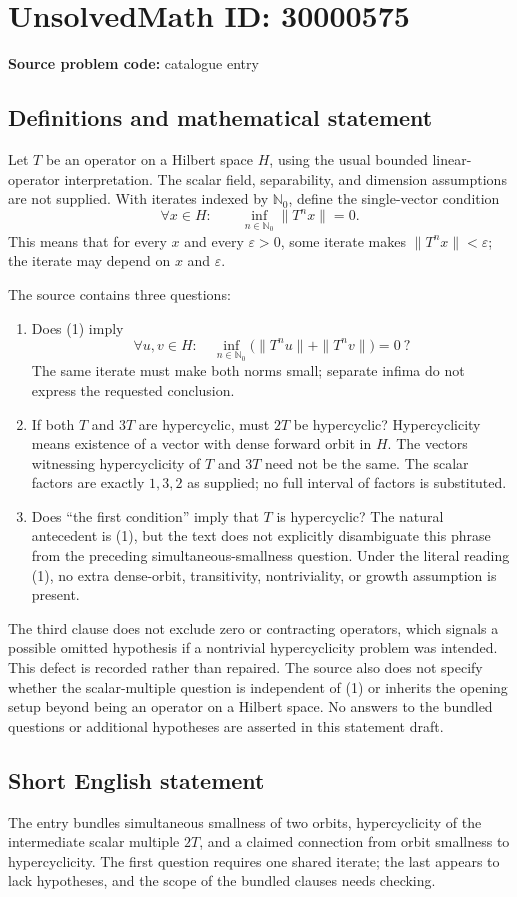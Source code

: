 \documentclass[11pt]{article}
\newcommand{\N}{\mathbb{N}}
\begin{document}
\section*{UnsolvedMath ID: 30000575}
\textbf{Source problem code:} catalogue entry
\subsection{Definitions and mathematical statement}
Let $T$ be an operator on a Hilbert space $H$, using the usual bounded linear-operator interpretation. The scalar field, separability, and dimension assumptions are not supplied. With iterates indexed by $\N_0$, define the single-vector condition
\[
 \forall x\in H:\qquad\inf_{n\in\N_0}\|T^nx\|=0.
 \tag{1}
\]
This means that for every $x$ and every $\varepsilon>0$, some iterate makes $\|T^nx\|<\varepsilon$; the iterate may depend on $x$ and $\varepsilon$.

The source contains three questions:
\begin{enumerate}
\item Does (1) imply
\[
 \forall u,v\in H:\quad
 \inf_{n\in\N_0}\bigl(\|T^nu\|+\|T^nv\|\bigr)=0\ ?
\]
The same iterate must make both norms small; separate infima do not express the requested conclusion.
\item If both $T$ and $3T$ are hypercyclic, must $2T$ be hypercyclic? Hypercyclicity means existence of a vector with dense forward orbit in $H$. The vectors witnessing hypercyclicity of $T$ and $3T$ need not be the same. The scalar factors are exactly $1,3,2$ as supplied; no full interval of factors is substituted.
\item Does ``the first condition'' imply that $T$ is hypercyclic? The natural antecedent is (1), but the text does not explicitly disambiguate this phrase from the preceding simultaneous-smallness question. Under the literal reading (1), no extra dense-orbit, transitivity, nontriviality, or growth assumption is present.
\end{enumerate}

The third clause does not exclude zero or contracting operators, which signals a possible omitted hypothesis if a nontrivial hypercyclicity problem was intended. This defect is recorded rather than repaired. The source also does not specify whether the scalar-multiple question is independent of (1) or inherits the opening setup beyond being an operator on a Hilbert space. No answers to the bundled questions or additional hypotheses are asserted in this statement draft.
\subsection{Short English statement}
The entry bundles simultaneous smallness of two orbits, hypercyclicity of the intermediate scalar multiple $2T$, and a claimed connection from orbit smallness to hypercyclicity. The first question requires one shared iterate; the last appears to lack hypotheses, and the scope of the bundled clauses needs checking.
\end{document}
